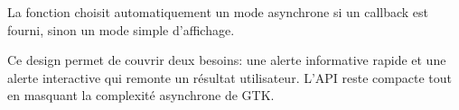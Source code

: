 La fonction choisit automatiquement un mode asynchrone si un callback est fourni, sinon un mode simple d'affichage.

Ce design permet de couvrir deux besoins: une alerte informative rapide et une alerte interactive qui remonte un résultat utilisateur. L'API reste compacte tout en masquant la complexité asynchrone de GTK.

\newpage
